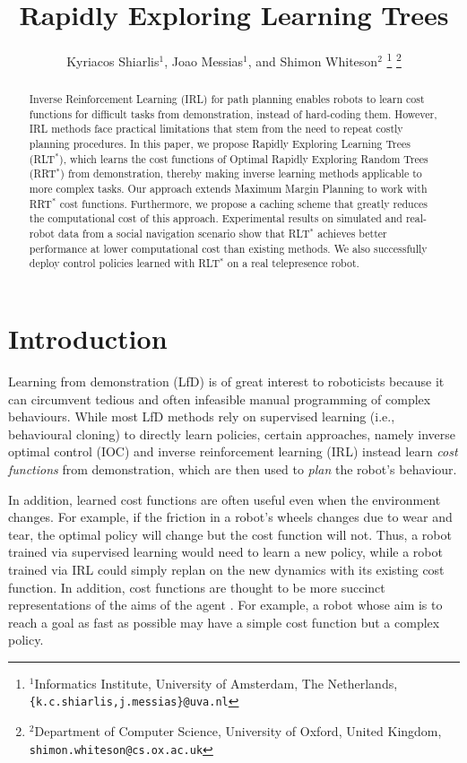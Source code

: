 \documentclass[letterpaper, 10 pt, conference]{ieeeconf}
\title{\LARGE \bf
Rapidly Exploring Learning Trees
}
\author{Kyriacos Shiarlis$^{1}$, Joao Messias$^{1}$, and Shimon Whiteson$^{2}$%
\thanks{$^{1}$Informatics Institute, University of Amsterdam, The Netherlands,
         {\tt\small \{k.c.shiarlis,j.messias\}@uva.nl}}%
\thanks{$^{2}$Department of Computer Science, University of Oxford, United Kingdom,
         {\tt\small shimon.whiteson@cs.ox.ac.uk}}%
}
\begin{document}
\maketitle

\thispagestyle{empty}
\pagestyle{empty}


\begin{abstract}
Inverse Reinforcement Learning (IRL) for path planning enables robots to learn cost functions for difficult tasks from demonstration, instead of hard-coding them. However, IRL methods face practical limitations that stem from the need to repeat costly planning procedures.
In this paper, we propose Rapidly Exploring Learning Trees (RLT$^*$), which learns the cost functions of Optimal Rapidly Exploring Random Trees (RRT$^*$) from demonstration, thereby making inverse learning methods applicable to more complex tasks. Our approach extends Maximum Margin Planning to work with RRT$^*$ cost functions. Furthermore, we propose a caching scheme that greatly reduces the computational cost of this approach. Experimental results on simulated and real-robot data from a social navigation scenario show that RLT$^*$ achieves better performance at lower computational cost than existing methods.  We also successfully deploy control policies learned with RLT$^*$ on a real telepresence robot.


\end{abstract}


\section{Introduction}

Learning from demonstration (LfD) \cite{argall2009survey} is of great interest to roboticists because it can circumvent tedious and often infeasible manual programming of complex behaviours. While most LfD methods rely on supervised learning (i.e., behavioural cloning) to directly learn policies, certain approaches, namely inverse optimal control (IOC) \cite{kalman1964linear} and inverse reinforcement learning (IRL) \cite{abbeel2004apprenticeship} instead learn \emph{cost functions} from demonstration, which are then used to \emph{plan} the robot's behaviour. 

In addition, learned cost functions are often useful even when the environment changes.  For example, if the friction in a robot's wheels changes due to wear and tear, the optimal policy will change but the cost function will not. Thus, a robot trained via supervised learning would need to learn a new policy, while a robot trained via IRL could simply replan on the new dynamics with its existing cost function. In addition, cost functions are thought to be more succinct representations of the aims of the agent \cite{abbeel2004apprenticeship}. For example, a robot whose aim is to reach a goal as fast as possible may have a simple cost function but a complex policy. 
\end{document}
